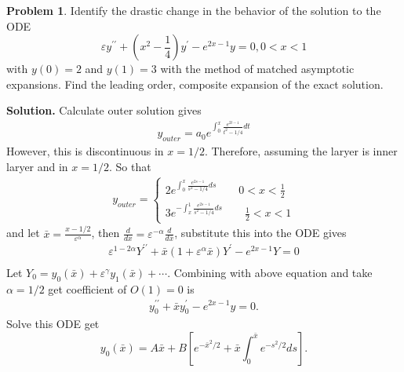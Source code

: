 \documentclass[a4paper]{book}
\newenvironment{solution}%
{\noindent\textbf{Solution.}}%
{\qedhere}
\numberwithin{equation}{chapter}
\theoremstyle{definition}
\newtheorem{pro}[exm]{Problem}
\begin{document}
\begin{pro}
  Identify the drastic change in the behavior of the solution to the ODE
  \[\varepsilon y^{\prime \prime} + \left( x^2 - \frac{1}{4} \right) y^\prime - e^{2x -1} y = 0, 0 < x < 1\]
  with $y(0) = 2$ and $y(1) = 3$ with the method of matched asymptotic expansions. Find the leading order, composite expansion of the exact solution.
\end{pro}

\begin{solution}
  Calculate outer solution gives
  \begin{align*}
    y_{outer} = a_0e^{\int_0^x \frac{e^{2t-1}}{t^2 - 1/4}dt}
  \end{align*}
  However, this is discontinuous in $x = 1/2$. Therefore, assuming the laryer is inner laryer and in $x = 1/2$. So that
  \begin{align*}
    y_{outer} =
    \begin{cases}
      2e^{\int_0^x \frac{e^{2s-1}}{s^2 - 1/4}ds}  \qquad 0 < x < \frac{1}{2}  \\
      3e^{-\int_x^1 \frac{e^{2s-1}}{s^2 - 1/4}ds}  \qquad \frac{1}{2} < x < 1
    \end{cases}
  \end{align*}
  and let $\bar{x} = \frac{x - 1/2}{\varepsilon^\alpha}$, then $\frac{d}{dx} = \varepsilon^{-\alpha} \frac{d}{d\bar{x}}$, substitute this into the ODE gives
  \begin{align*}
    \varepsilon^{1-2\alpha}Y^{\prime \prime} + \bar{x}(1 + \varepsilon^\alpha \bar{x}) Y^\prime - e^{2x-1}Y  = 0 \\
  \end{align*}
  Let $Y_0 = y_0(\bar{x}) + \varepsilon^\gamma y_1(\bar{x})+ \cdots$. Combining with above equation and take $\alpha = 1/2$ get coefficient of $O(1) = 0$ is
  \begin{align*}
    y_0^{\prime \prime} + \bar{x}y_0^\prime - e^{2x-1}y = 0.
  \end{align*}
  Solve this ODE get
  \[y_0(\bar{x}) = A \bar{x} + B[e^{-\bar{x}^2/2} + \bar{x}\int_0^{\bar{x}} e^{-s^2/2} ds].\]


\end{solution}
\end{document}
